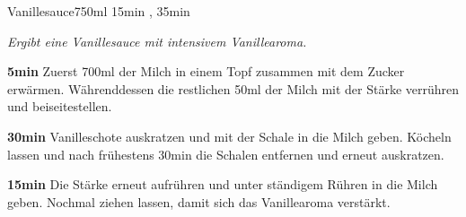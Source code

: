 \documentclass[../recipe-collections/cooking.tex]{subfiles}
\begin{document}
\begin{recipe}{Vanillesauce}{750ml }{15min , 35min }

  \freeform{}\textit{Ergibt eine Vanillesauce mit intensivem Vanillearoma.}


  \textbf{5min}
  Zuerst 700ml der Milch in einem Topf zusammen mit dem Zucker erwärmen.
  Währenddessen die restlichen 50ml der Milch mit der Stärke verrühren und beiseitestellen.


  \textbf{30min}
  Vanilleschote auskratzen und mit der Schale in die Milch geben.
  Köcheln lassen und nach frühestens 30min die Schalen entfernen und erneut auskratzen.

  \newstep{}\textbf{15min}
  Die Stärke erneut aufrühren und unter ständigem Rühren in die Milch geben.
  Nochmal ziehen lassen, damit sich das Vanillearoma verstärkt.

  \freeform{}\hrulefill{}

\end{recipe}
\end{document}
